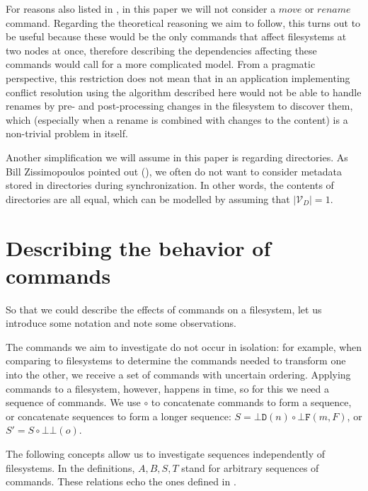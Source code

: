 \documentclass[12pt]{article}
\newcommand{\setvx}[1]{\mathcal{V}_{#1}}
\newcommand{\setd}{\setvx{D}} %
\newcommand{\empt}{\bot}
\newcommand{\fscommand}[2]{{#1#2}}
\newcommand{\fsregcommandchar}[1]{\mathtt{#1}}
\newcommand{\fsregcommand}[2]{\fscommand{\fsregcommandchar{#1}}{\fsregcommandchar{#2}}}
\newcommand{\cbb}{\fsregcommand{\empt}{\empt}}
\newcommand{\cbf}{\fsregcommand{\empt}{F}}
\newcommand{\cbd}{\fsregcommand{\empt}{D}}
\newcommand{\cc}{\circ} %
\theoremstyle{definition}
\begin{document}

For reasons also listed in \cite{NREC:alg}, in this paper we will not consider
a $move$ or $rename$ command. Regarding the theoretical reasoning we aim to follow,
this turns out to be useful because these would be the only commands that affect
filesystems at two nodes at once, therefore describing 
the dependencies affecting these commands
would call for a more complicated model.
From a pragmatic perspective, this restriction does not mean that in an application
implementing conflict resolution using the algorithm described here would not be
able to handle renames by pre- and post-processing changes in the filesystem to
discover them, which (especially when a rename is combined with changes to the content)
is a non-trivial problem in itself.

Another simplification we will assume in this paper is regarding directories.
As Bill Zissimopoulos pointed out (\cite{BZ}), we often do not want to consider metadata stored in
directories during synchronization. In other words, the contents of directories are all equal,
which can be modelled by assuming that $|\setd|=1$.




\section{Describing the behavior of commands}


So that we could describe the effects of commands on a filesystem, let us introduce some notation
and note some observations.

The commands we aim to investigate do not occur in isolation:
for example, when comparing to filesystems to determine the commands needed to transform one into the other,
we receive a set of commands with uncertain ordering.
Applying commands to a filesystem, however, happens in time,
so for this we need a sequence of commands.
We use $\cc$ to concatenate commands to form a sequence, or concatenate sequences to form a longer sequence:
$S=\cbd(n)\cc \cbf(m,F)$, or $S'=S\cc\cbb(o)$.

The following concepts allow us to investigate sequences independently of filesystems.
In the definitions, $A,B,S,T$ stand for arbitrary sequences of commands.
These relations echo the ones defined in \cite{NREC:alg}.
\end{document}
